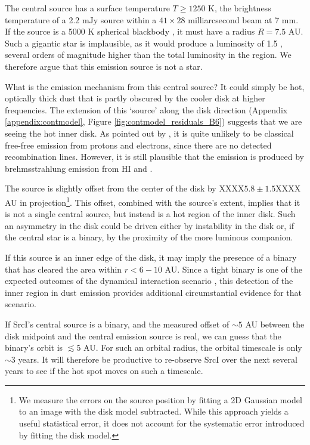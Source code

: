\documentclass[twocolumn]{aastex61}
\newcommand{\sourcei}{SrcI\xspace}
\begin{document}
The central source has a surface temperature $T\geq1250$ K, the brightness
temperature of a 2.2 mJy source within a $41\times28$ milliarcsecond beam at 7
mm.  If the source is a 5000 K spherical blackbody \citep[e.g.,][]{Testi2010a},
it must have a radius $R=7.5$ AU.  Such a gigantic star is implausible, as it
would produce a luminosity of 1.5 \lsun, several orders of magnitude
higher than the total luminosity in the region.  We therefore argue
that this emission source is not a star.

What is the emission mechanism from this central source?
It could simply be hot, optically thick dust that is partly obscured by the
cooler disk at higher frequencies.  The  extension of this `source' along the
disk direction (Appendix \ref{appendix:contmodel}, Figure
\ref{fig:contmodel_residuals_B6}) suggests that we are
seeing the hot inner disk.  As pointed out by \citet{Plambeck2016a}, it is
quite unlikely to be classical free-free emission from protons
and electrons, since there are no detected
recombination lines.  However, it is still plausible that the emission is
produced by brehmsstrahlung emission from HI and \hh
\citep{Reid2007a,Baez-Rubio2018a}.

The source is slightly offset from the center of the disk by XXXX$5.8\pm1.5$XXXX AU in
projection\footnote{We measure the errors on the source position by fitting a
2D Gaussian model to an image with the disk model subtracted.  While this approach
yields a useful statistical error, it does not account for the systematic error
introduced by fitting the disk model. }.  This offset,
combined with the source's extent, implies that it is
not a single central source, but
instead is a hot region of the inner disk.  Such an asymmetry in the disk could
be driven either by instability in the disk or, if the central star is a
binary, by the proximity of the more luminous companion.

If this source is an inner edge of the disk, it may imply the presence of a
binary that has cleared the area within $r<6-10$ AU.  Since a tight binary is
one of the expected outcomes of the dynamical interaction scenario
\citep{Goddi2011b}, this
detection of the inner region in dust emission provides additional
circumstantial evidence for that scenario.

If SrcI's central source is a binary, and the measured offset of $\sim5$ AU
between the disk midpoint and the central emission source is real, we can guess
that the binary's orbit is $\lesssim5$ AU.  For such an orbital radius, the
orbital timescale is only $\sim3$ years.   It will therefore be productive to
re-observe \sourcei over the next several years to see if the hot spot moves on
such a timescale.
\end{document}

